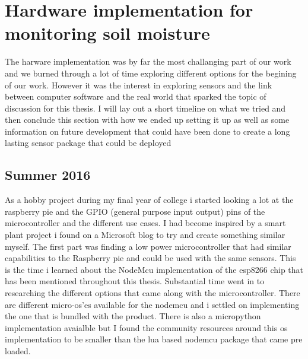 \documentclass[]{uiophd}
\begin{document}
  
\section{Hardware implementation for monitoring soil moisture}
The harware implementation was by far the most challanging part of our work and we burned through a lot of time exploring different options for the begining of our work. However it was the interest in exploring sensors and the link between computer software and the real world that sparked the topic of discussion for this thesis. I will lay out a short timeline on what we tried and then conclude this section with how we ended up setting it up as well as some information on future development that could have been done to create a long lasting sensor package that could be deployed 
\subsection{Summer 2016}
As a hobby project during my final year of college i started looking a lot at the raspberry pie and the GPIO (general purpose input output) pins of the microcontroller and the different use cases. I had become inspired by a smart plant project i found on a Microsoft blog to try and create something similar myself. The first part was finding a low power microcontroller that had similar capabilities to the Raspberry pie and could be used with the same sensors. This is the time i learned about the NodeMcu implementation of the esp8266 chip that has been mentioned throughout this thesis. Substantial time went in to researching the different options that came along with the microcontroller. There are different micro-os'es available for the nodemcu and i settled on implementing the one that is bundled with the product. There is also a micropython implementation avaialble but I found the community resources around this os implementation to be smaller than the lua based nodemcu package that came pre loaded.
\end{document}
